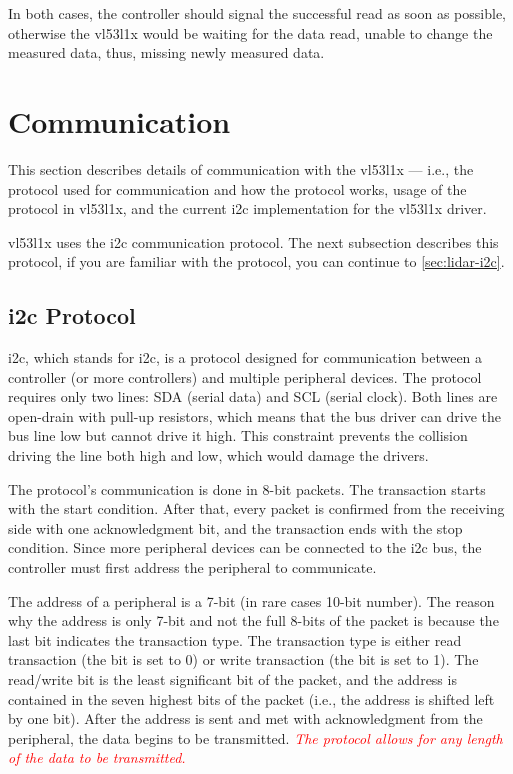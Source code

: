 \documentclass[
  digital,     %
  oneside,     %
  nosansbold,  %
  nocolorbold, %
  nolof,         %
  nolot,         %
]{fithesis4}
\newcommand{\TODO}[1]{\textcolor{red}{\textit{#1}}}
\begin{document}
{{{In both cases, the controller should signal the successful read as soon as possible, otherwise the \gls{vl53l1x} would be waiting for the data read,  unable to change the measured data, thus, missing newly measured data.

\section{ Communication }
This section describes details of communication with the \gls{vl53l1x} --- i.e., the protocol used for communication and how the protocol works, usage of the protocol in \gls{vl53l1x}, and the current \acrshort{i2c} implementation for the \gls{vl53l1x} driver. 

\gls{vl53l1x} uses the \acrshort{i2c} communication protocol. The next subsection describes this protocol, if you are familiar with the protocol, you can continue to \autoref{sec:lidar-i2c}.

\subsection[ Inter-Integrated Circuit Protocol ]{ \acrlong{i2c} Protocol } \label{sec:i2c}
\acrshort{i2c}, which stands for \acrlong{i2c}, is a protocol designed for communication between a controller (or more controllers) and multiple peripheral devices. The protocol requires only two lines: SDA (serial data) and SCL (serial clock). Both lines are open-drain with pull-up resistors, which means that the bus driver can drive the bus line low but cannot drive it high. This constraint prevents the collision driving the line both high and low, which would damage the drivers.

The protocol's communication is done in 8-bit packets. The transaction starts with the start condition. After that, every packet is confirmed from the receiving side with one acknowledgment bit, and the transaction ends with the stop condition. Since more peripheral devices can be connected to the \acrshort{i2c} bus, the controller must first address the peripheral to communicate.

The address of a peripheral is a 7-bit (in rare cases 10-bit number). The reason why the address is only 7-bit and not the full 8-bits of the packet is because the last bit indicates the transaction type. The transaction type is either read transaction (the bit is set to 0) or write transaction (the bit is set to 1). The read/write bit is the least significant bit of the packet, and the address is contained in the seven highest bits of the packet (i.e., the address is shifted left by one bit). After the address is sent and met with acknowledgment from the peripheral, the data begins to be transmitted. \TODO{The protocol allows for any length of the data to be transmitted.}

}}}
\end{document}
